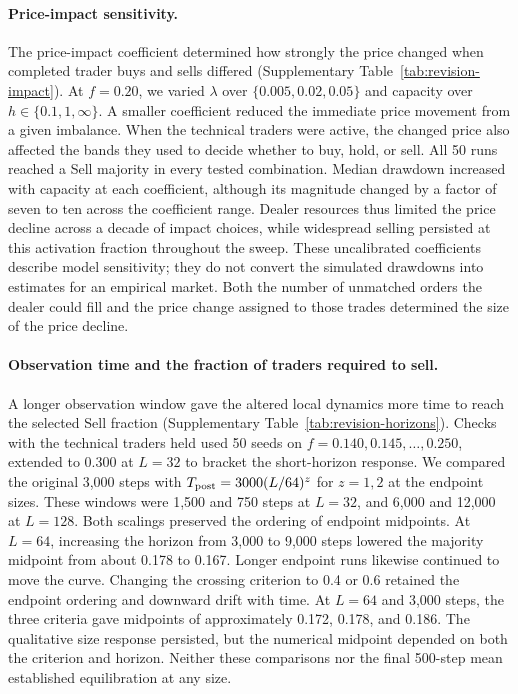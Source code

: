 \paragraph{Price-impact sensitivity.}
The price-impact coefficient determined how strongly the price changed
when completed trader buys and sells differed (Supplementary Table~\ref{tab:revision-impact}).
At $f=0.20$, we varied $\lambda$ over $\{0.005,0.02,0.05\}$ and
capacity over $h\in\{0.1,1,\infty\}$. A smaller coefficient reduced
the immediate price movement from a given imbalance. When the technical traders were active, the changed price also affected the
bands they used to decide whether to buy, hold, or sell. All 50 runs reached a Sell majority in every tested combination. Median
drawdown increased with capacity at each coefficient, although its
magnitude changed by a factor of seven to ten across the coefficient
range. Dealer resources thus
limited the price decline across a decade of impact choices, while
widespread selling persisted at this activation fraction throughout
the sweep. These uncalibrated coefficients describe model sensitivity;
they do not convert the simulated drawdowns into estimates for an
empirical market. Both the number of unmatched orders the dealer could fill and the
price change assigned to those trades determined the size of the
price decline.

\paragraph{Observation time and the fraction of traders required to sell.}
A longer observation window gave the altered local dynamics more time
to reach the selected Sell fraction
(Supplementary Table~\ref{tab:revision-horizons}). Checks with the
technical traders held used 50 seeds on $f=0.140,0.145,\ldots,0.250$, extended to 0.300 at
$L=32$ to bracket the short-horizon response. We compared the original
3,000 steps with $T_{\rm post}=3000(L/64)^z$ for $z=1,2$ at the
endpoint sizes. These windows were 1,500 and 750 steps at $L=32$,
and 6,000 and 12,000 at $L=128$. Both scalings preserved the ordering
of endpoint midpoints. At $L=64$, increasing the horizon from 3,000
to 9,000 steps lowered the majority midpoint from about 0.178 to 0.167.
Longer endpoint runs likewise continued to move the curve. Changing
the crossing criterion to 0.4 or 0.6 retained the endpoint ordering
and downward drift with time. At $L=64$ and 3,000 steps, the three
criteria gave midpoints of approximately 0.172, 0.178, and 0.186.
The qualitative size response persisted, but the numerical midpoint
depended on both the criterion and horizon. Neither these comparisons
nor the final 500-step mean established equilibration at any size.

